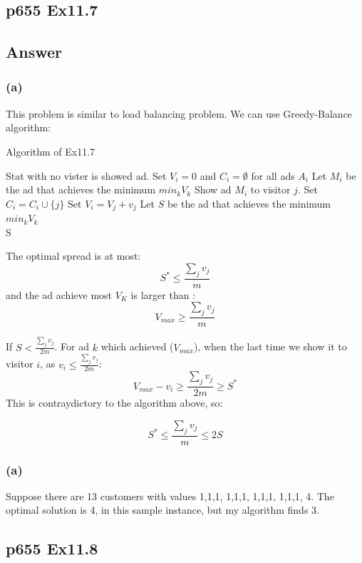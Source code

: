 \documentclass[a4paper]{article}
\begin{document}
\vspace*{2cm}



\subsection*{p655 Ex11.7}
\subsection*{Answer}
\subsubsection*{(a)}
This problem is similar to load balancing problem. We can use Greedy-Balance algorithm:
\begin{algorithm}[!htb]
	\caption{Algorithm of Ex11.7}
	\begin{algorithmic}[1]
		\State Stat with no vister is showed ad.
		\State Set $V_i=0$ and $C_i=\emptyset$ for all ads $A_i$
		\State Let $M_i$ be the ad that achieves the minimum $min_kV_k$
		\State Show ad $M_i$ to visitor $j$.
		\State Set $C_i= C_i \cup \{j\}$
		\State Set $V_i = V_j + v_j$
		\EndFor
		\State Let $S$ be the ad that achieves the minimum $min_kV_k$ \\
		\Return S
	\end{algorithmic}
\end{algorithm}
\par
The optimal spread is at most:
$$
	S^{*} \leq \frac{\sum_{j} v_{j}}{m}
$$
and the ad achieve most $V_K$ is larger than :
$$
	V_{max} \geq \frac{\sum_{j} v_{j}}{m}
$$

If $S < \frac{\sum_{j} v_{j}}{2m} $. For ad $k$ which achieved ($V_{max}$), when the last time we show it to visitor $i$, as $v_i \leq \frac{\sum_{j} v_{j}}{2m} $:
$$
	V_{max}-v_{i} \geq \frac{\sum_{j} v_{j}}{2m} \geq S^{*}
$$
This is contraydictory to the algorithm above, so:

$$
	S^{*} \leq \frac{\sum_{j} v_{j}}{m} \leq 2S
$$

\subsubsection*{(a)}
Suppose there are 13 customers with values 1,1,1, 1,1,1, 1,1,1, 1,1,1, 4. The optimal solution is 4, in this sample instance, but my algorithm finds 3.
\vspace{2cm}


\subsection*{p655 Ex11.8}
\end{document}
